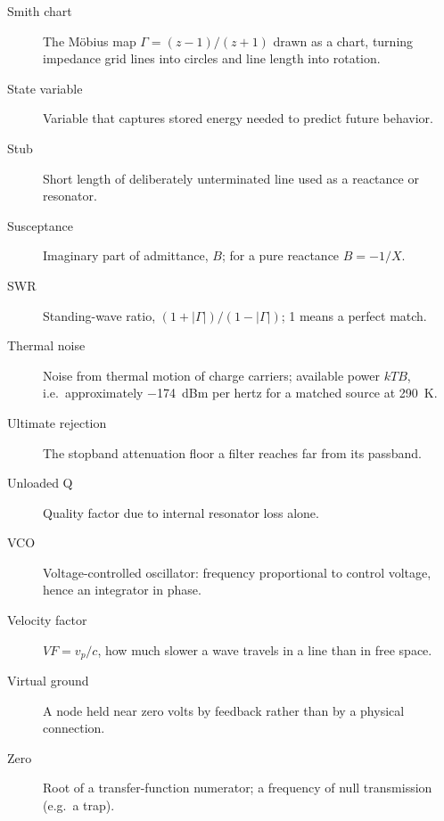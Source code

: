 \begin{description}
\item[Smith chart] The M\"obius map \(\Gamma=(z-1)/(z+1)\) drawn as a chart, turning impedance grid lines into circles and line length into rotation.
\item[State variable] Variable that captures stored energy needed to predict future behavior.
\item[Stub] Short length of deliberately unterminated line used as a reactance or resonator.
\item[Susceptance] Imaginary part of admittance, \(B\); for a pure reactance \(B=-1/X\).
\item[SWR] Standing-wave ratio, \((1+|\Gamma|)/(1-|\Gamma|)\); 1 means a perfect match.
\item[Thermal noise] Noise from thermal motion of charge carriers; available power \(kTB\), i.e.\ approximately \SI{-174}{dBm} per hertz for a matched source at \SI{290}{\kelvin}.
\item[Ultimate rejection] The stopband attenuation floor a filter reaches far from its passband.
\item[Unloaded Q] Quality factor due to internal resonator loss alone.
\item[VCO] Voltage-controlled oscillator: frequency proportional to control voltage, hence an integrator in phase.
\item[Velocity factor] \(VF=v_p/c\), how much slower a wave travels in a line than in free space.
\item[Virtual ground] A node held near zero volts by feedback rather than by a physical connection.
\item[Zero] Root of a transfer-function numerator; a frequency of null transmission (e.g.\ a trap).
\end{description}
